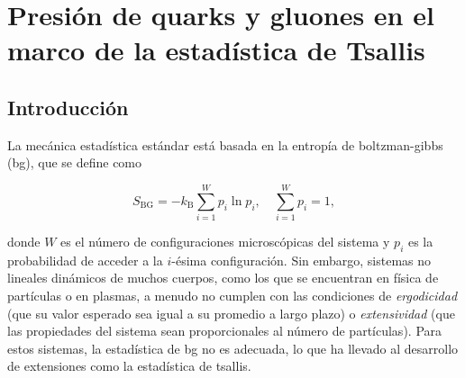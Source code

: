 \chapter{Presión de quarks y gluones en el marco de la estadística de Tsallis}\label{ch-Tsallis}


\pagestyle{fancy}
\fancyhf{} %
\fancyhead[LE]{\nouppercase{\textit{\rightmark}}} %
\fancyhead[RO]{\nouppercase{\textit{\rightmark}}} %

\section{Introducción}

La mecánica estadística estándar está basada en la entropía de \Gls{boltzman-gibbs} (\acrshort{bg}), que se define como

\begin{equation}
{S}_{\mathrm{BG}} = - {k}_{\mathrm{B}} \sum_{i=1}^{W} {p}_{i} \ln {p}_{i}, \quad \sum_{i=1}^{W} {p}_{i} = 1,
\end{equation}

donde \( W \) es el número de configuraciones microscópicas del sistema y \( {p}_{i} \) es la probabilidad de acceder a la \( i \)-ésima configuración. Sin embargo, sistemas no lineales dinámicos de muchos cuerpos, como los que se encuentran en física de partículas o en plasmas, a menudo no cumplen con las condiciones de \emph{ergodicidad} (que su valor esperado sea igual a su promedio a largo plazo) o \emph{extensividad} (que las propiedades del sistema sean proporcionales al número de partículas). Para estos sistemas, la estadística de \acrshort{bg} no es adecuada, lo que ha llevado al desarrollo de extensiones como la estadística de \Gls{tsallis}.

